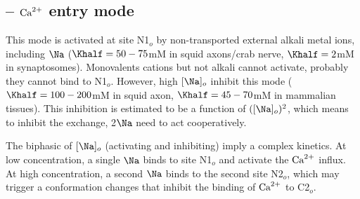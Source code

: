 \subsection{-- ${\text{Ca}^{2+}}$ entry mode}
\label{sec:calcium-entry-mode}

This mode is activated at site N1$_o$ by non-transported external
alkali metal ions, including $\Na$ ($\Khalf = 50-75$mM in squid
axons/crab nerve, $\Khalf = 2$mM in synaptosomes). Monovalents cations
but not alkali cannot activate, probably they cannot bind to
N1$_o$. However, high $[\Na]_o$ inhibit this mode ($\Khalf =
100-200$mM in squid axon, $\Khalf = 45-70$mM in mammalian
tissues). This inhibition is estimated to be a function of
$([\Na]_o)^2$, which means to inhibit the exchange, 2$\Na$ need to act
cooperatively.

\begin{framed}
  The biphasic of $[\Na]_o$ (activating and inhibiting) imply a
  complex kinetics. At low concentration, a single $\Na$ binds to site
  N1$_o$ and activate the ${\text{Ca}^{2+}}$ influx. At high concentration, a
  second $\Na$ binds to the second site N2$_o$, which may trigger a
  conformation changes that inhibit the binding of ${\text{Ca}^{2+}}$ to C2$_o$.
\end{framed}

